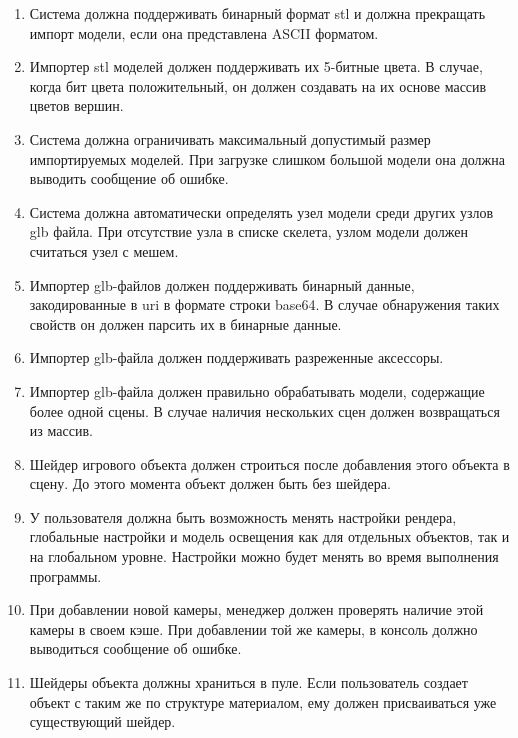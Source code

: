 \begin{enumerate}
	\item Система должна поддерживать бинарный формат stl и должна прекращать импорт модели, если она представлена ASCII форматом.
	
	\item Импортер stl моделей должен поддерживать их 5-битные цвета. В случае, когда бит цвета положительный, он должен создавать на их основе массив цветов вершин.
	
	\item Система должна ограничивать максимальный допустимый размер импортируемых моделей. При загрузке слишком большой модели она должна выводить сообщение об ошибке.
	
	\item Система должна автоматически определять узел модели среди других узлов glb файла. При отсутствие узла в списке скелета, узлом модели должен считаться узел с мешем.
	
	\item Импортер glb-файлов должен поддерживать бинарный данные, закодированные в uri в формате строки base64. В случае обнаружения таких свойств он должен парсить их в бинарные данные.
	
	\item Импортер glb-файла должен поддерживать разреженные аксессоры.
	
	\item Импортер glb-файла должен правильно обрабатывать модели, содержащие более одной сцены. В случае наличия нескольких сцен должен возвращаться из массив.
	
	\item Шейдер игрового объекта должен строиться после добавления этого объекта в сцену. До этого момента объект должен быть без шейдера.
	
	\item У пользователя должна быть возможность менять настройки рендера, глобальные настройки и модель освещения как для отдельных объектов, так и на глобальном уровне. Настройки можно будет менять во время выполнения программы.
	
	\item При добавлении новой камеры, менеджер должен проверять наличие этой камеры в своем кэше. При добавлении той же камеры, в консоль должно выводиться сообщение об ошибке.
	
	\item Шейдеры объекта должны храниться в пуле. Если пользователь создает объект с таким же по структуре материалом, ему должен присваиваться уже существующий шейдер.
	

\end{enumerate}
